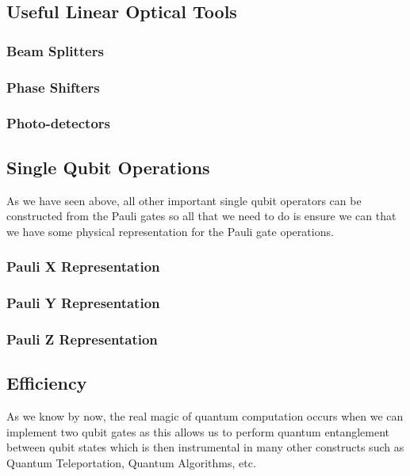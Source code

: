 \subsection{Useful Linear Optical Tools}
\subsubsection{Beam Splitters}
\subsubsection{Phase Shifters}
\subsubsection{Photo-detectors}


\subsection{Single Qubit Operations}
As we have seen above, all other important single qubit operators can be constructed from the Pauli gates so all that we need to do is ensure we can that we have some physical representation for the Pauli gate operations.
\subsubsection{Pauli X Representation}
\subsubsection{Pauli Y Representation}
\subsubsection{Pauli Z Representation}


\subsection{Efficiency}
As we know by now, the real magic of quantum computation occurs when we can implement two qubit gates as this allows us to perform quantum entanglement between qubit states which is then instrumental in many other constructs such as Quantum Teleportation, Quantum Algorithms, etc.

